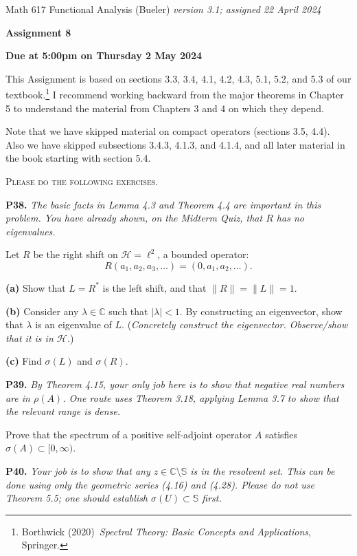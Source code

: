 \documentclass[12pt]{amsart}
\newcommand{\cH}{\mathcal{H}}
\newcommand{\CC}{\mathbb{C}}
\newcommand{\prob}[1]{\bigskip\noindent\textbf{#1.}\quad }
\newcommand{\epart}[1]{\medskip\noindent\textbf{(#1)}\quad }
\begin{document}
\scriptsize \noindent Math 617 Functional Analysis (Bueler) \hfill \emph{version 3.1; assigned 22 April 2024}
\normalsize\medskip

\Large\centerline{\textbf{Assignment 8}}
\large
\medskip

\centerline{\textbf{Due at 5:00pm on Thursday 2 May 2024}}
\medskip
\normalsize

\thispagestyle{empty}

\bigskip
\noindent This Assignment is based on sections 3.3, 3.4, 4.1, 4.2, 4.3, 5.1, 5.2, and 5.3 of our textbook.\footnote{Borthwick (2020)~\emph{Spectral Theory: Basic Concepts and Applications}, Springer.}  I recommend working backward from the major theorems in Chapter 5 to understand the material from Chapters 3 and 4 on which they depend.

\bigskip
\noindent Note that we have skipped material on compact operators (sections 3.5, 4.4).  Also we have skipped subsections 3.4.3, 4.1.3, and 4.1.4, and all later material in the book starting with section 5.4.

\medskip
\noindent \textsc{Please do the following exercises.}
\smallskip

\renewcommand{\SS}{\mathbb{S}}


\prob{P38}  \emph{The basic facts in Lemma 4.3 and Theorem 4.4 are important in this problem.  You have already shown, on the Midterm Quiz, that $R$ has no eigenvalues.}

\medskip\noindent Let $R$ be the right shift on $\cH=\ell^2$, a bounded operator:
	$$R (a_1,a_2,a_3,\dots) = (0,a_1,a_2,\dots).$$

\epart{a}  Show that $L=R^*$ is the left shift, and that $\|R\|=\|L\|=1$.

\epart{b}  Consider any $\lambda\in\CC$ such that $|\lambda|<1$.  By constructing an eigenvector, show that $\lambda$ is an eigenvalue of $L$.  (\emph{Concretely construct the eigenvector.  Observe/show that it is in $\cH$.})

\epart{c}  Find $\sigma(L)$ and $\sigma(R)$.


\prob{P39}  \emph{By Theorem 4.15, your only job here is to show that negative real numbers are in $\rho(A)$.  One route uses Theorem 3.18, applying Lemma 3.7 to show that the relevant range is dense.}

\medskip\noindent Prove that the spectrum of a positive self-adjoint operator $A$ satisfies $\sigma(A) \subset [0,\infty)$.


\prob{P40}  \emph{Your job is to show that any $z\in\CC\setminus \SS$ is in the resolvent set.  This can be done using only the geometric series (4.16) and (4.28).  Please do not use Theorem 5.5; one should establish $\sigma(U) \subset \SS$ first.}
\end{document}
